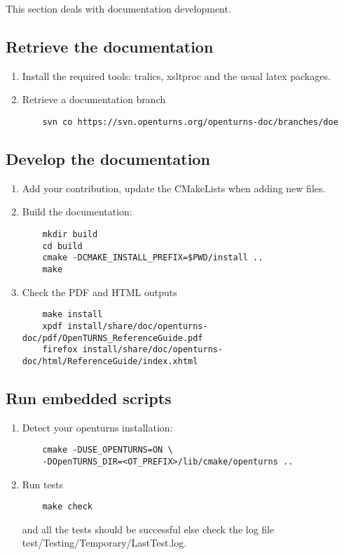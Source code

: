 This section deals with documentation development.

\subsection{Retrieve the documentation}

\begin{enumerate}
\item Install the required tools: tralics, xsltproc and the usual latex packages.
\item Retrieve a documentation branch
  \begin{lstlisting}
    svn co https://svn.openturns.org/openturns-doc/branches/doe
  \end{lstlisting}
  \setcounter{oldenumi}{\value{enumi}}
\end{enumerate}

\subsection{Develop the documentation}
\begin{enumerate}
  \setcounter{enumi}{\value{oldenumi}}
\item Add your contribution, update the CMakeLists when adding new files.
\item Build the documentation:
  \begin{lstlisting}
    mkdir build
    cd build
    cmake -DCMAKE_INSTALL_PREFIX=$PWD/install ..
    make
  \end{lstlisting}

\item Check the PDF and HTML outputs
  \begin{lstlisting}
    make install
    xpdf install/share/doc/openturns-doc/pdf/OpenTURNS_ReferenceGuide.pdf
    firefox install/share/doc/openturns-doc/html/ReferenceGuide/index.xhtml
  \end{lstlisting}

  \setcounter{oldenumi}{\value{enumi}}
\end{enumerate}

\subsection{Run embedded scripts}
\begin{enumerate}
  \setcounter{enumi}{\value{oldenumi}}
\item Detect your openturns installation:
  \begin{lstlisting}
    cmake -DUSE_OPENTURNS=ON \
    -DOpenTURNS_DIR=<OT_PREFIX>/lib/cmake/openturns ..
  \end{lstlisting}

\item Run tests
  \begin{lstlisting}
    make check
  \end{lstlisting}
  and all the tests should be successful else check the log file test/Testing/Temporary/LastTest.log.

\end{enumerate}
